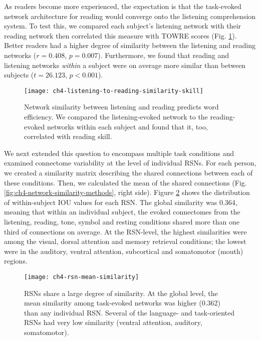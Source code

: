 As readers become more experienced, the expectation is that the task-evoked network architecture for reading would converge onto the listening comprehension system. To test this, we compared each subject's listening network with their reading network then correlated this measure with TOWRE scores (Fig.  \ref{fig:ch4-modality-similarity-to-reading}). Better readers had a higher degree of similarity between the listening and reading networks ($r = 0.408$, $p = 0.007$). Furthermore, we found that reading and listening networks \textit{within} a subject were on average more similar than between subjects ($t = 26.123$, $p < 0.001$). 

\begin{figure}[t!]
	\centering
	\texttt{[image: ch4-listening-to-reading-similarity-skill]}
    \caption[Network similarity between listening and reading predicts word efficiency]{Network similarity between listening and reading predicts word efficiency. We compared the listening-evoked network to the reading-evoked networks within each subject and found that it, too, correlated with reading skill.}
	\label{fig:ch4-modality-similarity-to-reading}
\end{figure}

We next extended this question to encompass multiple task conditions and examined connectome variability at the level of individual RSNs. For each person, we created a similarity matrix describing the shared connections between each of these conditions. Then, we calculated the mean of the shared connections (Fig. \ref{fig:ch4-network-similarity-methods}, right side). Figure \ref{fig:ch4-rsn-mean-similarity} shows the distribution of within-subject IOU values for each RSN. The global similarity was 0.364, meaning that within an individual subject, the evoked connectomes from the listening, reading, tone, symbol and resting conditions shared more than one third of connections on average. At the RSN-level, the highest similarities were among the visual, dorsal attention and memory retrieval conditions; the lowest were in the auditory, ventral attention, subcortical and somatomotor (mouth) regions.

\begin{figure}[t!]
	\centering
	\texttt{[image: ch4-rsn-mean-similarity]}
    \caption[RSNs share a large degree of similarity]{RSNs share a large degree of similarity. At the global level, the mean similarity among task-evoked networks was higher (0.362) than any individual RSN. Several of the language- and task-oriented RSNs had very low similarity (ventral attention, auditory, somatomotor).}
	\label{fig:ch4-rsn-mean-similarity}
\end{figure}

